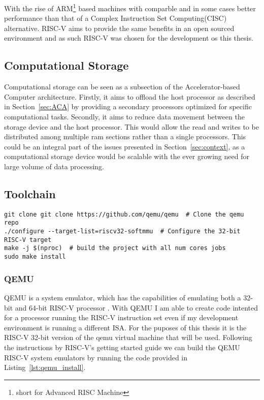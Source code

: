 With the rise of ARM\footnote{short for Advanced RISC Machine} based machines
with comparble and in some cases better performance than that of a Complex
Instruction Set Computing(CISC) alternative.\cite{Power_Struggle} RISC-V aims to
provide the same benefits in an open sourced environment and as such RISC-V was
chosen for the development os this thesis.

\subsection{Computational Storage}
Computational storage can be seen as a subsection of the Accelerator-based
Computer architecture. Firstly, it aims to offload the host processor as
described in Section~\ref{sec:ACA} by providing a secondary processors optimized
for specific computational tasks. Secondly, it aims to reduce data movement
between the storage device and the host processor. This would allow the read and
writes to be distributed among multiple ram sections rather than a single
processors. This could be an integral part of the issues presented in
Section~\ref{sec:context}, as a computational storage device would be scalable
with the ever growing need for large volume of data processing.


\subsection{Toolchain}
\begin{lstlisting}[caption=Installing QEMU, float=*, label=lst:qemu_install]
git clone git clone https://github.com/qemu/qemu  # Clone the qemu repo
./configure --target-list=riscv32-softmmu  # Configure the 32-bit RISC-V target
make -j $(nproc)  # build the project with all num cores jobs
sudo make install
\end{lstlisting}
\subsubsection{QEMU}
QEMU is a system emulator, which has the capabilities of emulating both a 32-bit
and 64-bit RISC-V processor \cite{QEMU}. With QEMU I am able to create code intented
for a processor running the RISC-V instruction set even if my development
environment is running a different ISA. For the puposes of this thesis it is the
RISC-V 32-bit version of the qemu virtual machine that will be used.
Following the instructions by RISC-V's getting started guide
we can build the QEMU RISC-V system emulators by running the code
provided in Listing~\ref{lst:qemu_install}\cite{RISC-V_GS}.

